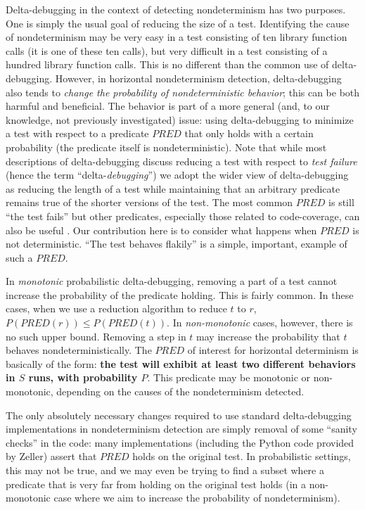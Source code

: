 Delta-debugging in the context of detecting nondeterminism has two
purposes.  One is simply the usual goal of reducing the size of a
test.  Identifying the cause of nondeterminism may be very easy in a
test consisting of ten library function calls (it is one of these ten
calls), but very difficult in a test consisting of a hundred library
function calls.  This is no different than the common use of
delta-debugging.  However, in horizontal nondeterminism detection,
delta-debugging also tends to \emph{change the probability of
  nondeterministic behavior}; this can be both harmful and
beneficial.  The behavior is part of a more general (and, to our
knowledge, not previously investigated) issue:  using delta-debugging
to minimize a test with respect to a predicate $\mathit{PRED}$ that only holds with a
certain probability (the predicate itself is nondeterministic).  Note
that while most descriptions of delta-debugging discuss reducing a
test with respect to \emph{test failure} (hence the term
``delta-\emph{debugging}'') we adopt the wider view of delta-debugging
as reducing the length of a test while maintaining that an arbitrary
predicate remains true of the shorter versions of the test.  The
most common $\mathit{PRED}$ is still ``the test fails'' but other predicates,
especially those related to code-coverage, can also be useful
\cite{icst2014,stvrcausereduce,NonAdeq}.  Our contribution here is to consider
what happens when $\mathit{PRED}$ is not deterministic.
``The test behaves flakily'' is a simple, important, example of such a $\mathit{PRED}$.

In \emph{monotonic} probabilistic delta-debugging, removing a part of a test cannot
increase the probability of the predicate holding.  This is fairly
common.  In these cases, when we use a reduction algorithm to reduce $t$
to $r$, $P(\mathit{PRED}(r)) \leq P(\mathit{PRED}(t))$.  In \emph{non-monotonic} cases,
however, there is no such upper bound.  Removing a step in $t$ may
increase the probability that $t$ behaves nondeterministically.
The $\mathit{PRED}$ of interest for horizontal determinism is basically of
the form:  {\bf the test will exhibit at least two different behaviors in $S$
runs, with probability $P$}.  This predicate may be monotonic or
non-monotonic, depending on the causes of the nondeterminism detected.

The only absolutely necessary changes required to use standard
delta-debugging implementations in nondeterminism detection
are simply removal of some ``sanity checks'' in the code:  many
implementations (including the Python code provided by Zeller) assert
that $\mathit{PRED}$ holds on the original test.  In probabilistic
settings, this may not be true, and we may even be trying to find a
subset where a predicate that is very far from holding on the original test
holds (in a non-monotonic case where we aim to increase the probability
of nondeterminism).

